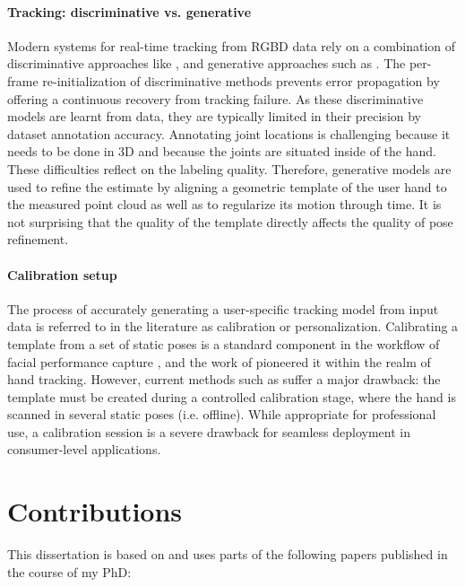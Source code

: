 \paragraph{Tracking: discriminative vs. generative} Modern systems for real-time tracking from RGBD data \cite{sridhar2015fast,sharp2015accurate} rely on a combination of discriminative approaches like \cite{keskin2012hand}, and generative approaches such as \cite{oiko2011hand}. The per-frame re-initialization of discriminative methods prevents error propagation by offering a continuous recovery from tracking failure. As these discriminative models are learnt from data, they are typically limited in their precision by dataset annotation accuracy. Annotating joint locations is challenging because it needs to be done in 3D and because the joints are situated inside of the hand. These difficulties reflect on the labeling quality. Therefore, generative models are used to refine the estimate by aligning a geometric template of the user hand to the measured point cloud as well as to regularize its motion through time. It is not surprising that the quality of the template directly affects the quality of pose refinement.

\paragraph{Calibration setup} The process of accurately generating a user-specific tracking model from input data is referred to in the literature as calibration or personalization. Calibrating a template from a set of static poses is a standard component in the workflow of facial performance capture \cite{weise2011realtime,cao2015facial}, and the work of \cite{taylor2014user} pioneered it within the realm of hand tracking. However, current methods such as \cite{taylor2016joint} suffer a major drawback: the template must be created during a controlled calibration stage, where the hand is scanned in several static poses (i.e. offline). While appropriate for professional use, a calibration session is a severe drawback for seamless deployment in consumer-level applications. 


\section{Contributions}

This dissertation is based on and uses parts of the following papers published in
the course of my PhD:

